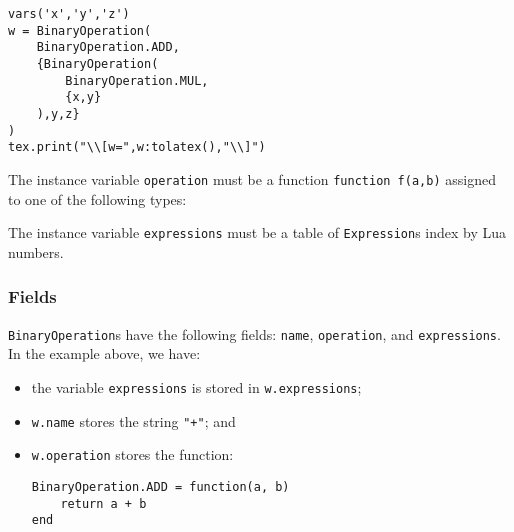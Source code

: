 \documentclass{article}
\begin{document}
\begin{codebox}
\begin{verbatim}
vars('x','y','z')
w = BinaryOperation(
    BinaryOperation.ADD,
    {BinaryOperation(
        BinaryOperation.MUL,
        {x,y}
    ),y,z}
)
tex.print("\\[w=",w:tolatex(),"\\]")
\end{verbatim}
\tcblower
{}
\end{codebox}
The instance variable \texttt{operation} must be a function \texttt{function f(a,b)} assigned to one of the following types:
\bgroup
{}
\egroup
The instance variable \texttt{expressions} must be a table of \texttt{Expression}s index by Lua numbers.

\subsubsection*{Fields}

\texttt{BinaryOperation}s have the following fields: \texttt{name}, \texttt{operation}, and \texttt{expressions}. In the example above, we have:
\begin{itemize}
    \item the variable \texttt{expressions} is stored in \texttt{w.expressions};
    \item \texttt{w.name} stores the string \texttt{"+"}; and 
    \item \texttt{w.operation} stores the function:
    \begin{verbatim}
BinaryOperation.ADD = function(a, b)
    return a + b
end
    \end{verbatim}
\end{itemize}
\end{document}
